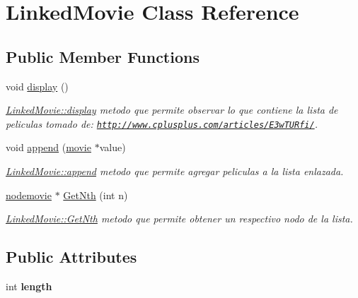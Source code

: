 \hypertarget{classLinkedMovie}{}\section{Linked\+Movie Class Reference}
\label{classLinkedMovie}
\subsection*{Public Member Functions}
\begin{DoxyCompactItemize}
\item 
\mbox{\label{classLinkedMovie_abf106e58193c746be1017162a9014430}} 
void \hyperlink{classLinkedMovie_abf106e58193c746be1017162a9014430}{display} ()
\begin{DoxyCompactList}\small\item\em \hyperlink{classLinkedMovie_abf106e58193c746be1017162a9014430}{Linked\+Movie\+::display} metodo que permite observar lo que contiene la lista de peliculas tomado de\+: \href{http://www.cplusplus.com/articles/E3wTURfi/}{\tt http\+://www.\+cplusplus.\+com/articles/\+E3w\+T\+U\+Rfi/}. \end{DoxyCompactList}\item 
void \hyperlink{classLinkedMovie_a2c7101f06839c16d7648b7b5e0266a35}{append} (\hyperlink{classmovie}{movie} $\ast$value)
\begin{DoxyCompactList}\small\item\em \hyperlink{classLinkedMovie_a2c7101f06839c16d7648b7b5e0266a35}{Linked\+Movie\+::append} metodo que permite agregar peliculas a la lista enlazada. \end{DoxyCompactList}\item 
\hyperlink{classnodemovie}{nodemovie} $\ast$ \hyperlink{classLinkedMovie_a7a281c3d7e77bd0784f9ca4ce0e9deb3}{Get\+Nth} (int n)
\begin{DoxyCompactList}\small\item\em \hyperlink{classLinkedMovie_a7a281c3d7e77bd0784f9ca4ce0e9deb3}{Linked\+Movie\+::\+Get\+Nth} metodo que permite obtener un respectivo nodo de la lista. \end{DoxyCompactList}\end{DoxyCompactItemize}
\subsection*{Public Attributes}
\begin{DoxyCompactItemize}
\item 
\mbox{\label{classLinkedMovie_a101e43ff834bf34ca25be16b50d1284c}} 
int {\bfseries length}
\end{DoxyCompactItemize}


